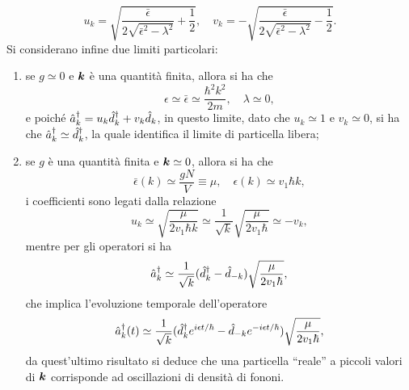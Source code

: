 \begin{equation}
    u_k = \sqrt{\frac{\bar{\epsilon}}{2\sqrt{\bar{\epsilon}^2 - \lambda^2}} + \frac{1}{2}},\quad v_k = -\sqrt{\frac{\bar{\epsilon}}{2\sqrt{\bar{\epsilon}^2 - \lambda^2}} - \frac{1}{2}}.
\end{equation}
Si considerano infine due limiti particolari:
\begin{enumerate}
    \item se $g \simeq 0$ e $\bm{k}$ è una quantità finita, allora si ha che 
    \begin{equation}
        \epsilon \simeq \bar{\epsilon} \simeq \frac{\hbar^2k^2}{2m},\quad \lambda \simeq 0,
    \end{equation}
    e poiché $\hat{a}^\dagger_k = u_k\hat{d}^\dagger_k + v_k\hat{d}_k$, in questo limite, dato che $u_k \simeq 1$ e $v_k \simeq 0$, si ha che $\hat{a}^\dagger_k \simeq \hat{d}^\dagger_k$, la quale identifica il limite di particella libera;
    \item se $g$ è una quantità finita e $\bm{k} \simeq 0$, allora si ha che
    \begin{equation}
        \bar{\epsilon}(k) \simeq \frac{gN}{V} \equiv \mu,\quad \epsilon(k) \simeq v_1\hbar k,
    \end{equation}
    i coefficienti sono legati dalla relazione
    \begin{equation}
        u_k \simeq \sqrt{\frac{\mu}{2v_1\hbar k}} \simeq \frac{1}{\sqrt{k}}\sqrt{\frac{\mu}{2v_1\hbar}} \simeq -v_k,
    \end{equation}
    mentre per gli operatori si ha
    \begin{equation}
        \hat{a}^\dagger_k \simeq \frac{1}{\sqrt{k}}(\hat{d}^\dagger_k - \hat{d}_{-k})\sqrt{\frac{\mu}{2v_1\hbar}},
    \end{equation}
    che implica l'evoluzione temporale dell'operatore
    \begin{equation}
        \hat{a}^\dagger_k(t) \simeq \frac{1}{\sqrt{k}}(\hat{d}^\dagger_ke^{i\epsilon t/\hbar} - \hat{d}_{-k}e^{-i\epsilon t/\hbar})\sqrt{\frac{\mu}{2v_1\hbar}},
    \end{equation}
    da quest'ultimo risultato si deduce che una particella ``reale'' a piccoli valori di $\bm{k}$ corrisponde ad oscillazioni di densità di fononi.
\end{enumerate}

